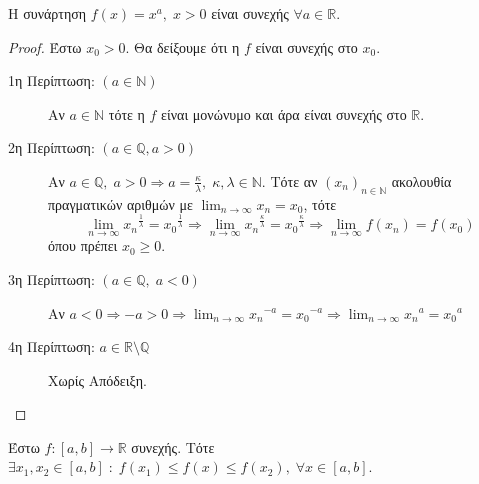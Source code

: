 \documentclass[main.tex]{subfiles}
\begin{document}
        \begin{prop}
            Η συνάρτηση $ f(x) = x^{a}, \; x>0 $ είναι συνεχής $ \forall a 
            \in \mathbb{R} $.
        \end{prop}

        \begin{proof}
            Έστω $ x_{0}>0 $. Θα δείξουμε ότι η $f$ είναι συνεχής στο $ x_{0} $.
            \begin{description}
                \item [1η Περίπτωση: $(a \in \mathbb{N})$]
                    Αν $ a \in \mathbb{N} $ τότε η $ f $ είναι μονώνυμο και άρα είναι συνεχής στο 
                    $ \mathbb{R} $.
                \item [2η Περίπτωση: $(a \in \mathbb{Q}, a>0)$]
                    Αν $ a \in \mathbb{Q}, \; a >0  \Rightarrow a = \frac{\kappa}{\lambda}, \; 
                    \kappa, \lambda \in \mathbb{N} $. Τότε αν $ (x_{n})_{n \in \mathbb{N}} $ 
                    ακολουθία πραγματικών αριθμών με $ \lim_{n \to \infty} x_{n} = x_{0} $, τότε
                    \[
                        \lim_{n \to \infty} {x_{n}}^{\frac{1}{\lambda}} = 
                        {x_{0}}^{\frac{1}{\lambda}} \Rightarrow \lim_{n \to \infty} 
                        {x_{n}}^{\frac{\kappa}{\lambda} } = {x_{0}}^{\frac{\kappa}{\lambda}} 
                        \Rightarrow \lim_{n \to \infty} f(x_{n}) = f(x_{0})
                    \] 
                    όπου πρέπει $ x_{0} \geq 0 $.
                \item [3η Περίπτωση: $(a \in \mathbb{Q}, \; a<0) $]
                    Αν $ a<0 \Rightarrow -a>0 \Rightarrow \lim_{n \to \infty} {x_{n}}^{-a} = 
                    {x_{0}}^{-a} \Rightarrow \lim_{n \to \infty} {x_{n}}^{a} = {x_{0}}^{a} $
                \item [4η Περίπτωση: $ a \in \mathbb{R} \setminus \mathbb{Q} $] 
                    Χωρίς Απόδειξη.
            \end{description}
        \end{proof}

        \begin{thm}
            Έστω $ f \colon [a,b] \to \mathbb{R} $ συνεχής. Τότε $ \exists x_{1}, x_{2} \in 
            [a,b] \; : \; f(x_{1}) \leq f(x) \leq f(x_{2}), \; \forall x \in [a,b]$.
        \end{thm}
\end{document}
